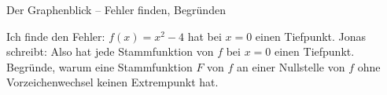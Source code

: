 
\begin{aufgabe}{Der Graphenblick – Fehler finden, Begründen}
\begin{teile}
\teil Ich finde den Fehler: $f(x) = x^2 - 4$ hat bei $x = 0$ einen Tiefpunkt. Jonas schreibt: Also hat jede Stammfunktion von $f$ bei $x = 0$ einen Tiefpunkt.
\teil Begründe, warum eine Stammfunktion $F$ von $f$ an einer Nullstelle von $f$ ohne Vorzeichenwechsel keinen Extrempunkt hat.
\end{teile}
\end{aufgabe}
